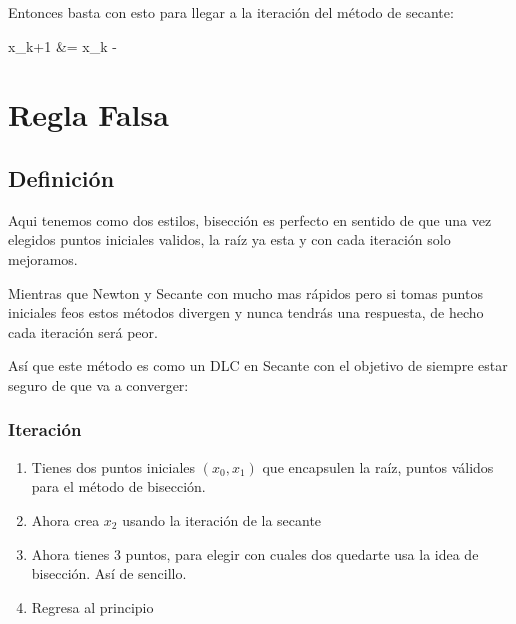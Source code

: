 \documentclass[12pt, fleqn]{report}                             %
\def \Eq {equation}                                             %
\newenvironment{MultiLineEquation*}[1]                          %
        {\begin{\Eq*}\begin{alignedat}{#1}}                         %
        {\end{alignedat}\end{\Eq*}}                                 %
\newenvironment{LargeEq} {\begingroup \Large}{\endgroup}        %
\newcommand \Quote              {\qq}                           %
\theoremstyle{break}                                            %
\newcommand{\Wrap}[1]           {\left( #1 \right)}             %
\newcommand{\Color}[2]{\textcolor{#1}{#2}}                      %
\newcommand \ColorFun          {Red700MD}                       %
\newcommand \ColorVarX         {Purple300MD}                    %
\newcommand \ColorVarXpu       {Purple700MD}                    %
\newcommand \ColorVarXmu       {Blue300MD}                      %
\newcommand \Fun[1]      {\Color{\ColorFun}{\pmb{f}\Wrap{#1}}}          %
\newcommand \VarX        {\Color{\ColorVarX}{x_k }}                     %
\newcommand \VarXpu      {\Color{\ColorVarXpu}{x_{k+1}  }}              %
\newcommand \VarXmu      {\Color{\ColorVarXmu}{x_{k-1}  }}              %
\begin{document}
            Entonces basta con esto para llegar a la iteración del método de secante:
            \begin{LargeEq}
                \begin{MultiLineEquation*}{3}
                    \VarXpu &= \VarX - \dfrac{\Fun{\VarX}(\VarX - \VarXmu)}{ \Fun{\VarX} - \Fun{\VarXmu} }     
                \end{MultiLineEquation*}
            \end{LargeEq}


    \chapter{Regla Falsa}

    \section{Definición}

        Aqui tenemos como dos estilos, bisección es perfecto en sentido de que una vez elegidos
        puntos iniciales validos, la raíz ya esta \Quote{encerrada} y con cada iteración solo mejoramos.

        Mientras que Newton y Secante con mucho mas rápidos pero si tomas puntos iniciales feos 
        estos métodos divergen y nunca tendrás una respuesta, de hecho cada iteración será peor.
        
        Así que este método es como un DLC en Secante con el objetivo de siempre estar seguro de
        que va a converger:

        \subsection{Iteración}

            \begin{enumerate}
                \item Tienes dos puntos iniciales $(x_0, x_1)$ que encapsulen la raíz, puntos válidos para 
                    el método de bisección. 
                \item Ahora crea $x_2$ usando la iteración de la secante
                \item Ahora tienes 3 puntos, para elegir con cuales dos quedarte usa la idea
                    de bisección. Así de sencillo.
                \item Regresa al principio
            \end{enumerate}
\end{document}

